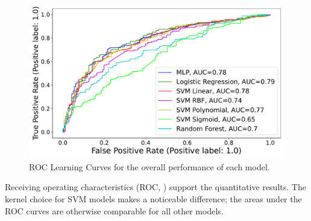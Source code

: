 



\begin{figure}[ht]
\centering
\includegraphics[width=8.cm]{plots/roccurves.pdf}
\caption{ROC Learning Curves for the overall performance of each model.}

\label{fig:roc}
\end{figure}


Receiving operating characteristics (ROC, ) support the quantitative results. The kernel choice for SVM models makes a noticeable difference; the areas under the ROC curves are otherwise comparable for all other models.

